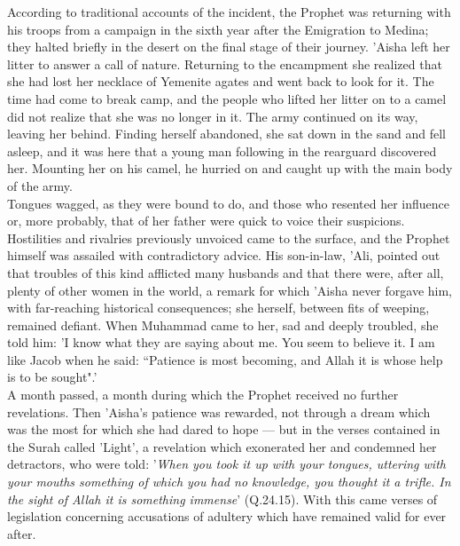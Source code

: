 \documentclass[10pt, twoside,openright]{book}
\begin{document}
According to traditional accounts of the incident, the Prophet was returning with his troops from a 
campaign in the sixth year after the Emigration to Medina; they halted briefly in the desert on the 
final stage of their journey. 'Aisha left her litter to answer a call of nature. Returning to the 
encampment she realized that she had lost her necklace of Yemenite agates and went back to look for 
it. The time had come to break camp, and the people who lifted her litter on to a camel did not 
realize that she was no longer in it. The army continued on its way, leaving her behind. Finding 
herself abandoned, she sat down in the sand and fell asleep, and it was here that a young man 
following in the rearguard discovered her. Mounting her on his camel, he hurried on and caught up 
with the main body of the army. \\

Tongues wagged, as they were bound to do, and those who resented her influence or, more probably, 
that of her father were quick to voice their suspicions. Hostilities and rivalries previously 
unvoiced came to the surface, and the Prophet himself was assailed with contradictory advice. His 
son\hyp{}in\hyp{}law, 'Ali, pointed out that troubles of this kind afflicted many husbands and that there were, 
after all, plenty of other women in the world, a remark for which 'Aisha never forgave him, with 
far-reaching historical consequences; she herself, between fits of weeping, remained defiant. When 
Muhammad came to her, sad and deeply troubled, she told him: 'I know what they are saying about me. 
You seem to believe it. I am like Jacob when he said: ``Patience is most becoming, and Allah it is 
whose help is to be sought".' \\

A month passed, a month during which the Prophet received no further revelations. Then 'Aisha's 
patience was rewarded, not through a dream which was the most for which she had dared to hope --- but 
in the verses contained in the Surah called 'Light', a revelation which exonerated her and condemned 
her detractors, who were told: '\emph{When you took it up with your tongues, uttering with your mouths 
something of which you had no knowledge, you thought it a trifle. In the sight of Allah it is 
something immense}' (Q.24.15). With this came verses of legislation concerning accusations of adultery 
which have remained valid for ever after. \\
\end{document}
